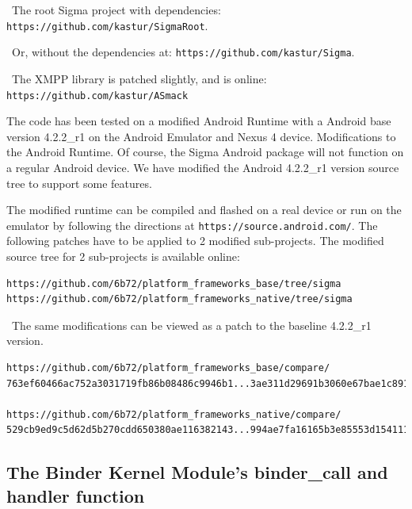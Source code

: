 \documentclass[prodmode]{acmlarge}
\begin{document}
\noindent~The root Sigma project with dependencies: \verb|https://github.com/kastur/SigmaRoot|.

\noindent~Or, without the dependencies at: \verb|https://github.com/kastur/Sigma|.

\noindent~The XMPP library is patched slightly, and is online: \verb|https://github.com/kastur/ASmack|

The code has been tested on a modified Android Runtime with a Android base version 4.2.2\_r1 on the Android Emulator and Nexus 4 device.
Modifications to the Android Runtime. Of course, the Sigma Android package will not function on a regular Android device. We have modified the Android 4.2.2\_r1 version source tree to support some features.

The modified runtime can be compiled and flashed on a real device or run on the emulator by following the directions at \verb|https://source.android.com/|. The following patches have to be applied to 2 modified sub-projects. The modified source tree for 2 sub-projects is available online:
\begin{Verbatim}
https://github.com/6b72/platform_frameworks_base/tree/sigma
https://github.com/6b72/platform_frameworks_native/tree/sigma
\end{Verbatim}

\noindent~The same modifications can be viewed as a patch to the baseline 4.2.2\_r1 version.
\begin{Verbatim}
https://github.com/6b72/platform_frameworks_base/compare/
763ef60466ac752a3031719fb86b08486c9946b1...3ae311d29691b3060e67bae1c891fb8fbbc1be0f

https://github.com/6b72/platform_frameworks_native/compare/
529cb9ed9c5d62d5b270cdd650380ae116382143...994ae7fa16165b3e85553d154111df0a2f5a5af3
\end{Verbatim}

\subsection{The Binder Kernel Module's binder\_call and handler function}
\label{app:binder_call}
\end{document}
